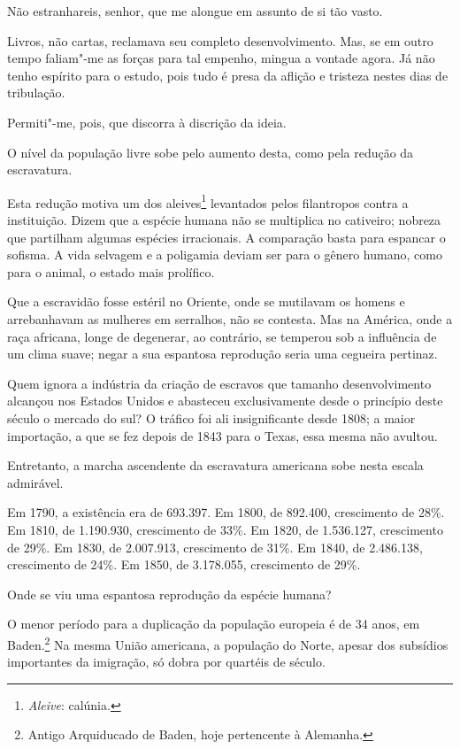 \begin{linenumbers}

Não estranhareis, senhor, que me alongue em assunto de si tão vasto.

 Livros, não cartas, reclamava seu completo desenvolvimento. Mas, se em
outro tempo faliam"-me as forças para tal empenho, mingua a vontade
agora. Já não tenho espírito para o estudo, pois tudo é presa da
aflição e tristeza nestes dias de tribulação. 

 Permiti"-me, pois, que discorra à discrição da ideia. 

 O nível da população livre sobe pelo aumento desta, como pela redução
da escravatura.

 Esta redução motiva um dos
aleives\footnote{ \textit{Aleive}: calúnia.}
 levantados pelos filantropos contra a instituição. Dizem que a espécie
humana não se multiplica no cativeiro; nobreza que partilham algumas
espécies irracionais. A comparação basta para espancar o sofisma. A
vida selvagem e a poligamia deviam ser para o gênero humano, como para
o animal, o estado mais prolífico.

 Que a escravidão fosse estéril no Oriente, onde se mutilavam os homens
e arrebanhavam as mulheres em serralhos, não se contesta. Mas na
América, onde a raça africana, longe de degenerar, ao contrário, se
temperou sob a influência de um clima suave; negar a sua espantosa
reprodução seria uma cegueira pertinaz. 

 Quem ignora a indústria da criação de escravos que tamanho
desenvolvimento alcançou nos Estados Unidos e abasteceu exclusivamente
desde o princípio deste século o mercado do sul? O tráfico foi ali
insignificante desde 1808; a maior importação, a que se fez depois de
1843 para o Texas, essa mesma não avultou. 

 Entretanto, a marcha ascendente da escravatura americana sobe nesta
escala admirável.

 Em 1790, a existência era de 693.397. Em 1800, de 892.400, crescimento
de 28\%. Em 1810, de 1.190.930, crescimento de 33\%. Em 1820, de
1.536.127, crescimento de 29\%. Em 1830, de 2.007.913, crescimento de
31\%. Em 1840, de 2.486.138, crescimento de 24\%. Em 1850, de
3.178.055, crescimento de 29\%. 

 Onde se viu uma espantosa reprodução da espécie humana?	\label{reproducao}

 O menor período para a duplicação da população europeia é de 34 anos,
em Baden.\footnote{ Antigo Arquiducado de Baden, hoje pertencente à Alemanha.}
 Na mesma União americana, a população do Norte, apesar dos subsídios
importantes da imigração, só dobra por quartéis de século.


\end{linenumbers}
